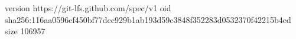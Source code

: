 version https://git-lfs.github.com/spec/v1
oid sha256:116aa0596ef450bf77dcc929b1ab193d59c3848f352283d0532370f42215b4ed
size 106957
